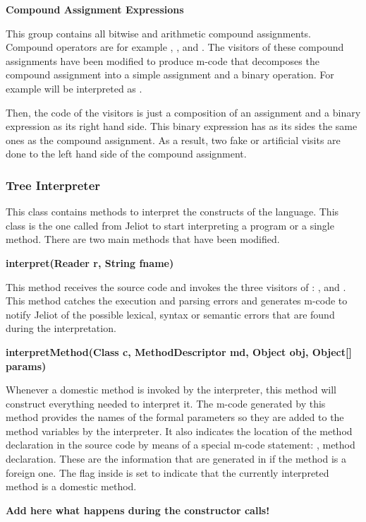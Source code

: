 {\bf{Compound Assignment Expressions}}

This group contains all bitwise and arithmetic compound assignments. Compound operators are for example \p{+=}, \p{-=}, \p{*=} and \p{/=}. The visitors of these compound assignments have been modified to produce m-code that decomposes the compound assignment into a simple assignment and a binary operation. For example  will be interpreted as .

Then, the code of the visitors is just a composition of an assignment and a binary expression as its right hand side. This binary expression has as its sides the same ones as the compound assignment. As a result, two fake or artificial visits are done to the left hand side of the compound assignment.

\subsubsection{Tree Interpreter}

This class contains methods to interpret the constructs of the language. This class is the one called from Jeliot to start interpreting a program or a single method. There are two main methods that have been modified.
 
{\bf{interpret(Reader r, String fname)}}

This method receives the source code and invokes the three visitors of \djava{}: ,  and . This method catches the execution and parsing errors and generates m-code to notify Jeliot of the possible lexical, syntax or semantic errors that are found during the interpretation.

{\bf{interpretMethod(Class c, MethodDescriptor md, Object obj, Object[] params)}}

Whenever a domestic method is invoked by the interpreter, this method will construct everything needed to interpret it. The m-code generated by this method provides the names of the formal parameters so they are added to the method variables by the \jel{} interpreter. It also indicates the location of the method declaration in the source code by means of a special m-code statement: , method declaration. These are the information that are generated in  if the method is a
foreign one. The flag inside is set to indicate that the currently interpreted method is a domestic method.

{\bf Add here what happens during the constructor calls!}
